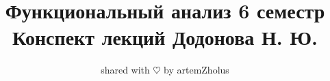 \documentclass{article}
\title{%
	Функциональный анализ 6 семестр \\
	\large Конспект лекций Додонова Н. Ю.}
\author{shared with $\heartsuit$ by artemZholus}
\date{}
\begin{document}
\theoremstyle{definition}
\newtheorem*{definition}{Определение}
\theoremstyle{plain}
\newtheorem{theorem}{Теорема}[section]
\newtheorem{axiom}{Аксиома}
\newtheorem{lemma}[theorem]{Лемма}
\newtheorem{statement}[theorem]{Утверждение}
\newtheorem{nb}[theorem]{N. B.}
\newtheorem{corollary}[theorem]{Следствие}
\theoremstyle{remark}
\newtheorem*{example}{Пример}
\newtheorem{property}[theorem]{Свойство}

\newcommand{\todo}{\textsc{\textbf{TODO}}}
\newcommand{\abs}[1]{\left|#1\right|}
\newcommand{\eqcls}[1]{\left[#1 \right]}
\newcommand{\norm}[1]{\left\|#1\right\|}
\newcommand{\bigslant}[2]{{\raisebox{.2em}{$#1$}\left/\raisebox{-.2em}{$#2$}\right.}}
\newcommand{\normp}[1]{\norm{#1}_p}
\newcommand\restr[2]{{\left.\kern-\nulldelimiterspace #1 \vphantom{\big|} \right|_{#2} }}
\newcommand{\normpp}[2]{\norm{#1}_{#2}}
\newcommand{\intl}[1]{\int\limits_{#1}}
\newcommand{\veel}[1]{\bigvee\limits_{#1}}
\newcommand{\veelr}[2]{\bigvee\limits_{#1}^{#2}}
\newcommand{\defeq}{\mathrel{\stackrel{\makebox[0pt]{\mbox{\normalfont\tiny def}}}{=}}}
\makeatletter
\newcommand*{\rom}[1]{\expandafter\@slowromancap\romannumeral #1@}
\makeatother
\newcommand{\iintl}[1]{\iint\limits_{#1}}
\newcommand{\pdiff}[2]{\frac{\partial #1}{\partial #2}}
\newcommand{\intlr}[2]{\int\limits_{#1}^{#2}}
\newcommand{\suml}[1]{\sum\limits_{#1}}
\newcommand{\sumlr}[2]{\sum\limits_{#1}^{#2}}
\newcommand{\feps}{\forall\varepsilon}
\newcommand{\Epsilon}{\varepsilon}
\newcommand{\scalarp}[2]{\left\langle #1 , #2\right\rangle}
\newcommand{\set}[1]{\left\{#1\right\}}
\renewcommand{\phi}{\varphi}
\maketitle
\tableofcontents
\newpage



\end{document}
